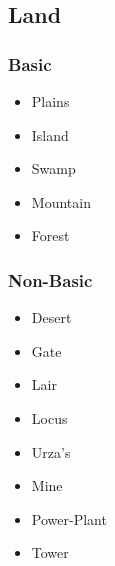 \documentclass{article}
\begin{document}
\subsection{Land}
\subsubsection{Basic}
\begin{multicols}{3}
    \begin{itemize}
        \item Plains
        \item Island
        \item Swamp
        \item Mountain
        \item Forest
    \end{itemize}
\end{multicols}
\subsubsection{Non-Basic}
\begin{multicols}{3}
    \begin{itemize}
        \item Desert
        \item Gate
        \item Lair
        \item Locus
        \item Urza's
        \item Mine
        \item Power-Plant
        \item Tower
    \end{itemize}
\end{multicols}
\end{document}
